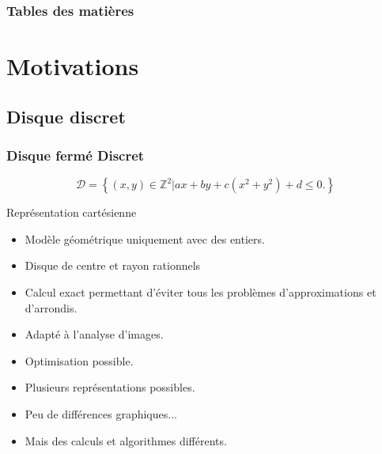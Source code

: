 \documentclass{beamer}
\begin{document}
\begin{frame}
  \frametitle{Tables des matières} %
  \setcounter{tocdepth}{1}
  \tableofcontents %
\end{frame}

\section{Motivations}

\subsection{Disque discret}
\begin{frame}
  \frametitle{Disque fermé Discret}
  \begin{block}{}
    $$\mathcal{D} =  \left\{ (x,y) \in \mathbb{Z}^{2} |  ax + by + c(x^2 + y^2) + d \leq 0. \right\}$$
  \end{block}

  \begin{block}{Représentation cartésienne}
    \begin{itemize}
      \item Modèle géométrique uniquement avec des entiers.
      \item Disque de centre et rayon rationnels
    \end{itemize}
  \end{block}
  \begin{exampleblock}{}
    \begin{itemize}
      \item Calcul exact permettant d'éviter tous les problèmes d'approximations et d'arrondis.
      \item Adapté à l'analyse d'images.
      \item Optimisation possible.
    \end{itemize}
  \end{exampleblock}

  \begin{exampleblock}{}
    \begin{itemize}
      \item Plusieurs représentations possibles.
      \item Peu de différences graphiques...
      \item Mais des calculs et algorithmes différents.
    \end{itemize}
  \end{exampleblock}

\end{frame}
\end{document}
